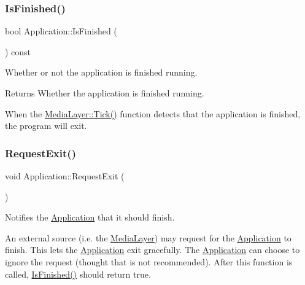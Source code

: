 \subsubsection{\texorpdfstring{Is\+Finished()}{IsFinished()}}
{\footnotesize\ttfamily bool Application\+::\+Is\+Finished (\begin{DoxyParamCaption}{ }\end{DoxyParamCaption}) const\hspace{0.3cm}{\ttfamily [virtual]}}



Whether or not the application is finished running.

\begin{DoxyReturn}{Returns}
Whether the application is finished running.
\end{DoxyReturn}
When the \hyperlink{class_media_layer_a570ff8c3fc3e8f3e720d9dcebafba143}{Media\+Layer\+::\+Tick()} function detects that the application is finished, the program will exit. \hypertarget{class_application_a9cbe96f94653eae2bb6ad5857b00fa10}{}\label{class_application_a9cbe96f94653eae2bb6ad5857b00fa10}
\subsubsection{\texorpdfstring{Request\+Exit()}{RequestExit()}}
{\footnotesize\ttfamily void Application\+::\+Request\+Exit (\begin{DoxyParamCaption}{ }\end{DoxyParamCaption})\hspace{0.3cm}{\ttfamily [virtual]}}



Notifies the \hyperlink{class_application}{Application} that it should finish.

An external source (i.\+e. the \hyperlink{class_media_layer}{Media\+Layer}) may request for the \hyperlink{class_application}{Application} to finish. This lets the \hyperlink{class_application}{Application} exit gracefully. The \hyperlink{class_application}{Application} can choose to ignore the request (thought that is not recommended). After this function is called, \hyperlink{class_application_a454a1d926759c4bfac47e730570a7743}{Is\+Finished()} should return true. \hypertarget{class_application_a2eb61ca027f223a5c5ad1bf982481193}{}\label{class_application_a2eb61ca027f223a5c5ad1bf982481193}
